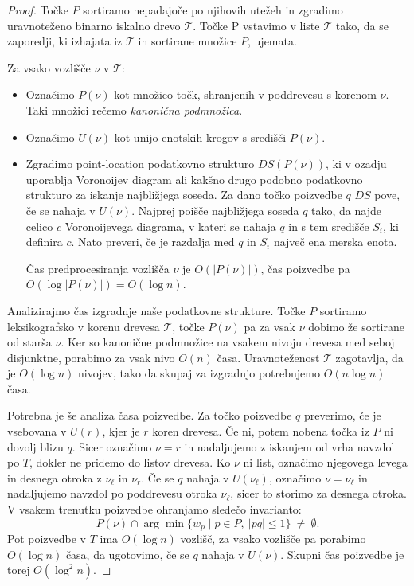 \documentclass[a4paper, 12pt]{book}
\newcommand{\T}{\ensuremath{\mathcal{T}}}
\begin{document}
\begin{proof}
Točke $P$ sortiramo nepadajoče po njihovih utežeh in zgradimo uravnoteženo binarno iskalno drevo $\T$. Točke P vstavimo v liste $\T$ tako, da se zaporedji, ki izhajata iz $\T$ in sortirane množice $P$, ujemata.

Za vsako vozlišče $\nu$ v $\T$:
\begin{itemize}
\item Označimo $P(\nu)$ kot množico točk, shranjenih v poddrevesu s korenom $\nu$. Taki množici rečemo \emph{kanonična podmnožica}.
\item Označimo $U(\nu)$ kot unijo enotskih krogov s središči $P(\nu)$.
\item Zgradimo point-location podatkovno strukturo $DS(P(\nu))$, ki v ozadju uporablja Voronoijev diagram ali kakšno drugo podobno podatkovno strukturo za iskanje najbližjega soseda. Za dano točko poizvedbe $q$ $DS$ pove, če se nahaja v $U(\nu)$. Najprej poišče najbližjega soseda $q$ tako, da najde celico $c$ Voronoijevega diagrama, v kateri se nahaja $q$ in s tem središče $S_i$, ki definira $c$. Nato preveri, če je razdalja med $q$ in $S_i$ največ ena merska enota.

Čas predprocesiranja vozlišča $\nu$ je $O(|P(\nu)|)$, čas poizvedbe pa $O(\log |P(\nu)|)= O(\log n)$.
\end{itemize}

Analizirajmo čas izgradnje naše podatkovne strukture. Točke $P$ sortiramo leksikografsko v korenu drevesa $\T$, točke $P(\nu)$ pa za vsak $\nu$ dobimo že sortirane od starša $\nu$. Ker so kanonične podmnožice na vsakem nivoju drevesa med seboj disjunktne, porabimo za vsak nivo $O(n)$ časa. Uravnoteženost $\T$ zagotavlja, da je $O(\log n)$ nivojev, tako da skupaj za izgradnjo potrebujemo $O(n\log n)$ časa.

Potrebna je še analiza časa poizvedbe. Za točko poizvedbe $q$ preverimo, če je vsebovana v $U(r)$, kjer je $r$ koren drevesa. Če ni, potem nobena točka iz $P$ ni dovolj blizu $q$. Sicer označimo $\nu = r$ in nadaljujemo z iskanjem od vrha navzdol po $T$, dokler ne pridemo do listov drevesa. Ko $\nu$ ni list, označimo njegovega levega in desnega otroka z $\nu_\ell$ in $\nu_r$. Če se $q$ nahaja v $U(\nu_\ell)$, označimo $\nu = \nu_\ell$ in nadaljujemo navzdol po poddrevesu otroka $\nu_\ell$, sicer to storimo za desnega otroka. V vsakem trenutku poizvedbe ohranjamo sledečo invarianto:
\[	P(\nu) \cap \arg\min \{ w_p \mid p\in P,~|pq|\le 1\} ~\not=~ \emptyset.
	\]	
Pot poizvedbe v $T$ ima $O(\log n)$ vozlišč, za vsako vozlišče pa porabimo $O(\log n)$ časa, da ugotovimo, če se $q$ nahaja v $U(\nu)$. Skupni čas poizvedbe je torej $O(\log^2 n)$.
\end{proof}
\end{document}
